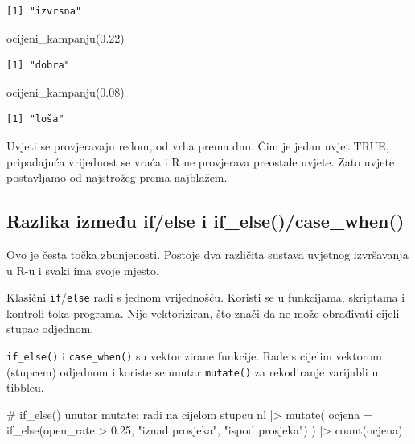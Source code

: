 \documentclass[
  croatian,
  letterpaper,
  DIV=11,
  numbers=noendperiod]{scrartcl}
\newenvironment{Shaded}{\begin{snugshade}}{\end{snugshade}}
\newcommand{\AttributeTok}[1]{\textcolor[rgb]{0.40,0.45,0.13}{#1}}
\newcommand{\CommentTok}[1]{\textcolor[rgb]{0.37,0.37,0.37}{#1}}
\newcommand{\FloatTok}[1]{\textcolor[rgb]{0.68,0.00,0.00}{#1}}
\newcommand{\FunctionTok}[1]{\textcolor[rgb]{0.28,0.35,0.67}{#1}}
\newcommand{\NormalTok}[1]{\textcolor[rgb]{0.00,0.23,0.31}{#1}}
\newcommand{\SpecialCharTok}[1]{\textcolor[rgb]{0.37,0.37,0.37}{#1}}
\newcommand{\StringTok}[1]{\textcolor[rgb]{0.13,0.47,0.30}{#1}}
\begin{document}
\begin{verbatim}
[1] "izvrsna"
\end{verbatim}

\begin{Shaded}
\begin{Highlighting}[]
\FunctionTok{ocijeni\_kampanju}\NormalTok{(}\FloatTok{0.22}\NormalTok{)}
\end{Highlighting}
\end{Shaded}

\begin{verbatim}
[1] "dobra"
\end{verbatim}

\begin{Shaded}
\begin{Highlighting}[]
\FunctionTok{ocijeni\_kampanju}\NormalTok{(}\FloatTok{0.08}\NormalTok{)}
\end{Highlighting}
\end{Shaded}

\begin{verbatim}
[1] "loša"
\end{verbatim}

Uvjeti se provjeravaju redom, od vrha prema dnu. Čim je jedan uvjet
TRUE, pripadajuća vrijednost se vraća i R ne provjerava preostale
uvjete. Zato uvjete postavljamo od najstrožeg prema najblažem.

\subsection{Razlika između if/else i
if\_else()/case\_when()}\label{razlika-izmeux111u-ifelse-i-if_elsecase_when}

Ovo je česta točka zbunjenosti. Postoje dva različita sustava uvjetnog
izvršavanja u R-u i svaki ima svoje mjesto.

Klasični \texttt{if}/\texttt{else} radi s jednom vrijednošću. Koristi se
u funkcijama, skriptama i kontroli toka programa. Nije vektoriziran, što
znači da ne može obrađivati cijeli stupac odjednom.

\texttt{if\_else()} i \texttt{case\_when()} su vektorizirane funkcije.
Rade s cijelim vektorom (stupcem) odjednom i koriste se unutar
\texttt{mutate()} za rekodiranje varijabli u tibbleu.

\begin{Shaded}
\begin{Highlighting}[]
\CommentTok{\# if\_else() unutar mutate: radi na cijelom stupcu}
\NormalTok{nl }\SpecialCharTok{|\textgreater{}}
  \FunctionTok{mutate}\NormalTok{(}
    \AttributeTok{ocjena =} \FunctionTok{if\_else}\NormalTok{(open\_rate }\SpecialCharTok{\textgreater{}} \FloatTok{0.25}\NormalTok{, }\StringTok{"iznad prosjeka"}\NormalTok{, }\StringTok{"ispod prosjeka"}\NormalTok{)}
\NormalTok{  ) }\SpecialCharTok{|\textgreater{}}
  \FunctionTok{count}\NormalTok{(ocjena)}
\end{Highlighting}
\end{Shaded}
\end{document}
